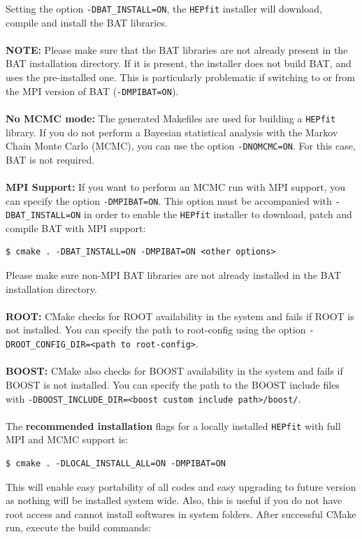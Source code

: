 \documentclass[preprint,3p,12pt]{elsarticle}
\newcommand{\HEPfit}{\texttt{HEPfit}\xspace}
\begin{document}
Setting the option \texttt{-DBAT\_INSTALL=ON}, the \HEPfit installer will download, 
compile and install the BAT libraries.\\\\
%
{\bf NOTE:}
Please make sure that the BAT libraries are not already present in the
BAT installation directory. If it is present, the installer does not
build BAT, and uses the pre-installed one. This is particularly problematic
if switching to or from the MPI version of BAT (\texttt{-DMPIBAT=ON}).\\\\
%
{\bf No MCMC mode:}
The generated Makefiles are used for building a \HEPfit library. If
you do not perform a Bayesian statistical analysis with the Markov
Chain Monte Carlo (MCMC), you can use the option \texttt{-DNOMCMC=ON}. For
this case, BAT is not required. \\\\
%
{\bf MPI Support:}
If you want to perform an MCMC run with MPI support, you can specify
the option \texttt{-DMPIBAT=ON}. This option must be accompanied with
\texttt{-DBAT\_INSTALL=ON} in order to enable the \HEPfit installer to
download, patch and compile BAT with MPI support:
\begin{lstlisting} 
$ cmake . -DBAT_INSTALL=ON -DMPIBAT=ON <other options>  
\end{lstlisting}
Please make sure non-MPI BAT libraries are not already installed in the 
BAT installation directory.\\\\
%
{\bf ROOT:}
CMake checks for ROOT availability in the system and fails if ROOT is
not installed. You can specify the path to root-config using the
option \texttt{-DROOT\_CONFIG\_DIR=<path to root-config>}. \\\\
%
{\bf BOOST:}
CMake also checks for BOOST availability in the system and fails if
BOOST is not installed. You can specify the path to the BOOST include
files with \texttt{-DBOOST\_INCLUDE\_DIR=<boost custom include path>/boost/}. \\\\
%
The {\bf recommended installation} flags for a locally installed \HEPfit with full MPI and MCMC support is:
\begin{lstlisting} 
$ cmake . -DLOCAL_INSTALL_ALL=ON -DMPIBAT=ON
\end{lstlisting}
This will enable easy portability of all codes and easy upgrading to future version as nothing will be installed system wide.  Also, this is useful if you do not have root access and cannot install softwares in system folders. After successful CMake run, execute the build commands:
\end{document}
